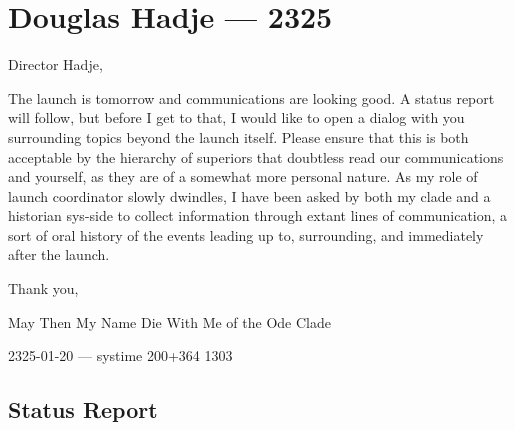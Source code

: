 \hypertarget{douglas-hadje-2325}{%
\chapter{Douglas Hadje — 2325}\label{douglas-hadje-2325}}

Director Hadje,

The launch is tomorrow and communications are looking good. A status report will follow, but before I get to that, I would like to open a dialog with you surrounding topics beyond the launch itself. Please ensure that this is both acceptable by the hierarchy of superiors that doubtless read our communications and yourself, as they are of a somewhat more personal nature. As my role of launch coordinator slowly dwindles, I have been asked by both my clade and a historian sys-side to collect information through extant lines of communication, a sort of oral history of the events leading up to, surrounding, and immediately after the launch.

Thank you,

May Then My Name Die With Me of the Ode Clade

2325-01-20 — systime 200+364 1303

\hypertarget{status-report}{%
\section{Status Report}\label{status-report}}


